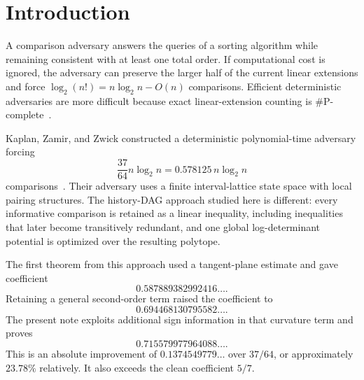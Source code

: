 \documentclass[11pt]{article}
\theoremstyle{definition}
\begin{document}
\tableofcontents

\section{Introduction}

A comparison adversary answers the queries of a sorting algorithm while remaining consistent with at least one total order.  If computational cost is ignored, the adversary can preserve the larger half of the current linear extensions and force $\log_2(n!)=n\log_2n-O(n)$ comparisons.  Efficient deterministic adversaries are more difficult because exact linear-extension counting is \#P-complete~\cite{BrightwellWinkler1991}.

Kaplan, Zamir, and Zwick constructed a deterministic polynomial-time adversary forcing
\[
  \frac{37}{64}n\log_2n=0.578125\,n\log_2n
\]
comparisons~\cite{KaplanZamirZwick2019}.  Their adversary uses a finite interval-lattice state space with local pairing structures.  The history-DAG approach studied here is different: every informative comparison is retained as a linear inequality, including inequalities that later become transitively redundant, and one global log-determinant potential is optimized over the resulting polytope.

The first theorem from this approach used a tangent-plane estimate and gave coefficient
\[
  0.587889382992416\ldots .
\]
Retaining a general second-order term raised the coefficient to
\[
  0.694468130795582\ldots .
\]
The present note exploits additional sign information in that curvature term and proves
\[
  \boxed{0.715579977964088\ldots}.
\]
This is an absolute improvement of $0.1374549779\ldots$ over $37/64$, or approximately $23.78\%$ relatively.  It also exceeds the clean coefficient $5/7$.
\end{document}
